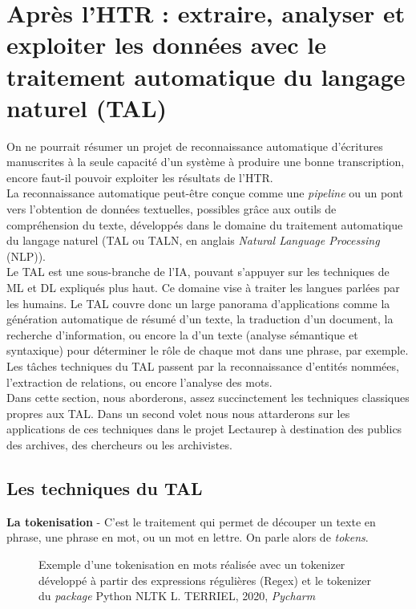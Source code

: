 \section{Après l'HTR : extraire, analyser et exploiter les données avec le traitement automatique du langage naturel (TAL)}\label{TAL_repertoire}

On ne pourrait résumer un projet de reconnaissance automatique d'écritures manuscrites à la seule capacité d'un système à produire une bonne transcription, encore faut-il pouvoir exploiter les résultats de l'HTR.\\

La reconnaissance automatique peut-être conçue comme une \textit{pipeline} ou un pont vers l'obtention de données textuelles, possibles grâce aux outils de compréhension du texte, développés dans le domaine du traitement automatique du langage naturel (TAL ou TALN, en anglais \textit{Natural Language Processing} (NLP)).\\

Le TAL est une sous-branche de l'IA, pouvant s'appuyer sur les techniques de ML et DL expliqués plus haut. Ce domaine vise à traiter les langues parlées par les humains. Le TAL couvre donc un large panorama d'applications comme la génération automatique de résumé d'un texte, la traduction d'un document, la recherche d'information, ou encore la  d'un texte (analyse sémantique et syntaxique) pour déterminer le rôle de chaque mot dans une phrase, par exemple. Les tâches techniques du TAL passent par la reconnaissance d'entités nommées, l'extraction de relations, ou encore l'analyse des mots.\\

Dans cette section, nous aborderons, assez succinctement les techniques classiques propres aux TAL. Dans un second volet nous nous attarderons sur les applications de ces techniques dans le projet Lectaurep à destination des publics des archives, des chercheurs ou les archivistes.\\
\newpage
\subsection{Les techniques du TAL}

\textbf{La tokenisation} - C'est le traitement qui permet de découper un texte en phrase, une phrase en mot, ou un mot en lettre. On parle alors de \textit{tokens}. 
\begin{figure}[h]
    \centering
    \centerline{}
    \caption{Exemple d'une tokenisation en mots réalisée avec un tokenizer développé à partir des expressions régulières (Regex) et le tokenizer du \textit{package} Python NLTK \textcopyright L. TERRIEL, 2020, \textit{Pycharm}}
    \label{fig:tokenisation}
\end{figure}


